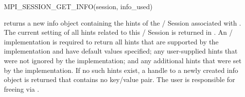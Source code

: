 \begin{funcdef}{MPI\_SESSION\_GET\_INFO}{(\mbox{session}, \mbox{info\_used})}
\end{funcdef}

 returns a new info object containing
the hints of the \MPI/ Session  associated with .
The current setting of all hints related to this \MPI/ Session is
returned in .  An \MPI/ implementation is required to
return all hints that are supported by the implementation and have
default values specified; any user-supplied hints that were not ignored
by the implementation; and any additional hints that were set by
the implementation.
If no such hints
exist, a handle to a newly created info object is returned that
contains no key/value pair.
The user is responsible for freeing
 via .

